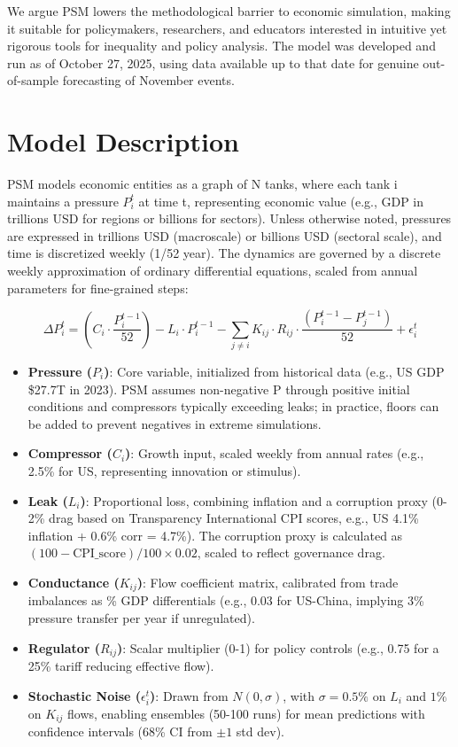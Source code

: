 \documentclass[11pt]{article}
\begin{document}
We argue PSM lowers the methodological barrier to economic simulation, making it suitable for policymakers, researchers, and educators interested in intuitive yet rigorous tools for inequality and policy analysis. The model was developed and run as of October 27, 2025, using data available up to that date for genuine out-of-sample forecasting of November events.

\section{Model Description}
PSM models economic entities as a graph of N tanks, where each tank i maintains a pressure $P_i^t$ at time t, representing economic value (e.g., GDP in trillions USD for regions or billions for sectors). Unless otherwise noted, pressures are expressed in trillions USD (macroscale) or billions USD (sectoral scale), and time is discretized weekly (1/52 year). The dynamics are governed by a discrete weekly approximation of ordinary differential equations, scaled from annual parameters for fine-grained steps:

\[
\Delta P_i^t = \left( C_i \cdot \frac{P_i^{t-1}}{52} \right) - L_i \cdot P_i^{t-1} - \sum_{j \neq i} K_{ij} \cdot R_{ij} \cdot \frac{(P_i^{t-1} - P_j^{t-1})}{52} + \epsilon_i^t
\]

\begin{itemize}
\item \textbf{Pressure ($P_i$)}: Core variable, initialized from historical data (e.g., US GDP \$27.7T in 2023). PSM assumes non-negative P through positive initial conditions and compressors typically exceeding leaks; in practice, floors can be added to prevent negatives in extreme simulations.
\item \textbf{Compressor ($C_i$)}: Growth input, scaled weekly from annual rates (e.g., 2.5\% for US, representing innovation or stimulus).
\item \textbf{Leak ($L_i$)}: Proportional loss, combining inflation and a corruption proxy (0-2\% drag based on Transparency International CPI scores, e.g., US 4.1\% inflation + 0.6\% corr = 4.7\%). The corruption proxy is calculated as $(100 - \text{CPI\_score}) / 100 \times 0.02$, scaled to reflect governance drag.
\item \textbf{Conductance ($K_{ij}$)}: Flow coefficient matrix, calibrated from trade imbalances as \% GDP differentials (e.g., 0.03 for US-China, implying 3\% pressure transfer per year if unregulated).
\item \textbf{Regulator ($R_{ij}$)}: Scalar multiplier (0-1) for policy controls (e.g., 0.75 for a 25\% tariff reducing effective flow).
\item \textbf{Stochastic Noise ($\epsilon_i^t$)}: Drawn from $N(0, \sigma)$, with $\sigma = 0.5\%$ on $L_i$ and $1\%$ on $K_{ij}$ flows, enabling ensembles (50-100 runs) for mean predictions with confidence intervals (68\% CI from $\pm 1$ std dev).
\end{itemize}
\end{document}
